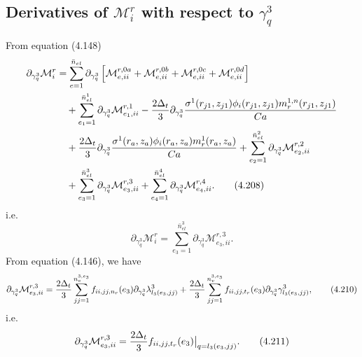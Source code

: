 \documentclass{article}
\begin{document}
\subsection{Derivatives of $\mathcal{M}_i^r$ with respect to $\gamma_q^3$} %
From equation (4.148)
\begin{align}
\partial_{\gamma_q^3}\mathcal{M}_i^r &= \sum_{e=1}^{\bar{n}_{el}} \partial_{\gamma_q^3} \left[ \mathcal{M}_{e,ii}^{r,0a} + \mathcal{M}_{e,ii}^{r,0b} + \mathcal{M}_{e,ii}^{r,0c} + \mathcal{M}_{e,ii}^{r,0d} \right] \nonumber\\
&\quad + \sum_{e_1=1}^{\bar{n}_{el}^1} \partial_{\gamma_q^3} \mathcal{M}_{e_1,ii}^{r,1} 
- \frac{2\Delta_t}{3} \partial_{\gamma_q^3} \frac{\sigma^1(r_{j1},z_{j1}) \phi_i(r_{j1},z_{j1}) m_r^{1,n}(r_{j1},z_{j1})}{Ca} \nonumber\\
&\quad + \frac{2\Delta_t}{3} \partial_{\gamma_q^3} \frac{\sigma^1(r_a,z_a) \phi_i(r_a,z_a) m_r^{1}(r_a,z_a)}{Ca} 
+ \sum_{e_2=1}^{\bar{n}_{el}^2} \partial_{\gamma_q^3} \mathcal{M}_{e_2,ii}^{r,2} \nonumber\\
&\quad + \sum_{e_3=1}^{\bar{n}_{el}^3} \partial_{\gamma_q^3} \mathcal{M}_{e_3,ii}^{r,3} 
+ \sum_{e_4=1}^{\bar{n}_{el}^4} \partial_{\gamma_q^3} \mathcal{M}_{e_4,ii}^{r,4}. \tag{4.208}
\end{align}
i.e.
\begin{equation}
\partial_{\gamma_q^3}\mathcal{M}_i^r = \sum_{e_3=1}^{\bar{n}_{el}^3} \partial_{\gamma_q^3} \mathcal{M}_{e_3,ii}^{r,3}. \tag{4.209}
\end{equation}
From equation (4.146), we have
\begin{equation}
\partial_{\gamma_q^3}\mathcal{M}_{e_3,ii}^{r,3} = \frac{2\Delta_t}{3} \sum_{jj=1}^{n_v^{3,e_3}} f_{ii,jj,n_r}(e_3) \partial_{\gamma_q^3} \lambda_{l_3(e_3,jj)}^3 
+ \frac{2\Delta_t}{3} \sum_{jj=1}^{n_v^{3,e_3}} f_{ii,jj,t_r}(e_3) \partial_{\gamma_q^3} \gamma_{l_3(e_3,jj)}^3, \tag{4.210}
\end{equation}
i.e.
\begin{equation}
\partial_{\gamma_q^3}\mathcal{M}_{e_3,ii}^{r,3} = \frac{2\Delta_t}{3} f_{ii,jj,t_r}(e_3) \big|_{q=l_3(e_3,jj)}. \tag{4.211}
\end{equation}
\end{document}
